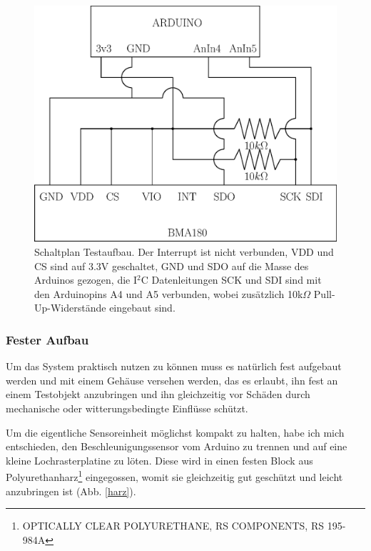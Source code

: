 \documentclass[12pt,a4paper]{scrartcl}
\begin{document}
\begin{figure}[ht]
\centering
\includegraphics[scale=.6]{schematics.eps}
\caption{Schaltplan Testaufbau. Der Interrupt ist nicht verbunden, VDD und CS sind auf 3.3V geschaltet, GND und SDO auf die Masse des Arduinos gezogen, die I$^2$C Datenleitungen SCK und SDI sind mit den Arduinopins A4 und A5 verbunden, wobei zusätzlich 10k$\Omega$ Pull-Up-Widerstände eingebaut sind.}
\label{schematics}
\end{figure}


\newpage
\subsubsection{Fester Aufbau}

Um das System praktisch nutzen zu können muss es natürlich fest aufgebaut werden und mit einem Gehäuse versehen werden, das es erlaubt, ihn fest an einem Testobjekt anzubringen und ihn gleichzeitig vor Schäden durch mechanische oder witterungsbedingte Einflüsse schützt.

Um die eigentliche Sensoreinheit möglichst kompakt zu halten, habe ich mich entschieden, den Beschleunigungssensor vom Arduino zu trennen und auf eine kleine Lochrasterplatine zu löten. Diese wird in einen festen Block aus Polyurethanharz\footnote{OPTICALLY CLEAR POLYURETHANE, RS COMPONENTS, RS 195-984A} eingegossen, womit sie gleichzeitig gut geschützt und leicht anzubringen ist (Abb. \ref{harz}). \\
\end{document}

